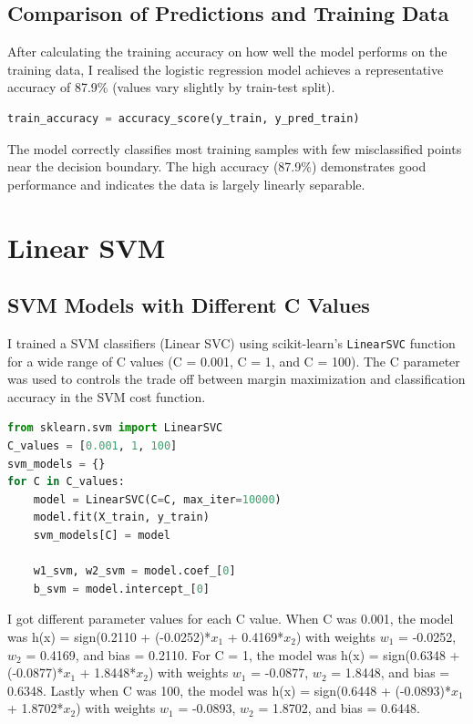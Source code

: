 \documentclass[12pt,a4paper]{article}
\begin{document}
\subsection{Comparison of Predictions and Training Data}

After calculating the training accuracy on how well the model performs on the training data, I realised the logistic regression model achieves a representative accuracy of 87.9\% (values vary slightly by train-test split).

\begin{lstlisting}[language=Python, caption={Training Accuracy}]
train_accuracy = accuracy_score(y_train, y_pred_train)
\end{lstlisting}

The model correctly classifies most training samples with few misclassified points near the decision boundary. The high accuracy (87.9\%) demonstrates good performance and indicates the data is largely linearly separable.

\section{Linear SVM}

\subsection{SVM Models with Different C Values}

I trained a SVM classifiers (Linear SVC) using scikit-learn's \texttt{LinearSVC} function for a wide range of C values (C = 0.001, C = 1, and C = 100). The C parameter was used to controls the trade off between margin maximization and classification accuracy in the SVM cost function.

\begin{lstlisting}[language=Python, caption={Training Linear SVM Models}]
from sklearn.svm import LinearSVC
C_values = [0.001, 1, 100]
svm_models = {}
for C in C_values:
    model = LinearSVC(C=C, max_iter=10000)
    model.fit(X_train, y_train)
    svm_models[C] = model

    w1_svm, w2_svm = model.coef_[0]
    b_svm = model.intercept_[0]
\end{lstlisting}

I got different parameter values for each C value. When C was 0.001, the model was h(x) = sign(0.2110 + (-0.0252)*$x_1$ + 0.4169*$x_2$) with weights $w_1$ = -0.0252, $w_2$ = 0.4169, and bias = 0.2110. For C = 1, the model was h(x) = sign(0.6348 + (-0.0877)*$x_1$ + 1.8448*$x_2$) with weights $w_1$ = -0.0877, $w_2$ = 1.8448, and bias = 0.6348. Lastly when C was 100, the model was h(x) = sign(0.6448 + (-0.0893)*$x_1$ + 1.8702*$x_2$) with weights $w_1$ = -0.0893, $w_2$ = 1.8702, and bias = 0.6448.
\end{document}
